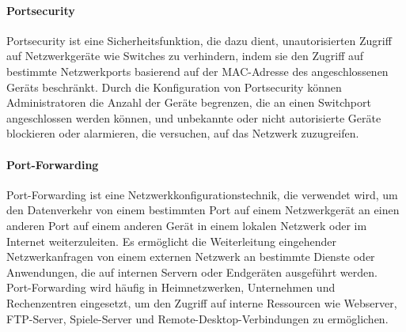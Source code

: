\paragraph{Portsecurity}

Portsecurity ist eine Sicherheitsfunktion, die dazu dient, unautorisierten Zugriff auf Netzwerkgeräte wie Switches zu verhindern, indem sie den Zugriff auf bestimmte Netzwerkports basierend auf der MAC-Adresse des angeschlossenen Geräts beschränkt. Durch die Konfiguration von Portsecurity können Administratoren die Anzahl der Geräte begrenzen, die an einen Switchport angeschlossen werden können, und unbekannte oder nicht autorisierte Geräte blockieren oder alarmieren, die versuchen, auf das Netzwerk zuzugreifen.

\paragraph{Port-Forwarding}

Port-Forwarding ist eine Netzwerkkonfigurationstechnik, die verwendet wird, um den Datenverkehr von einem bestimmten Port auf einem Netzwerkgerät an einen anderen Port auf einem anderen Gerät in einem lokalen Netzwerk oder im Internet weiterzuleiten. Es ermöglicht die Weiterleitung eingehender Netzwerkanfragen von einem externen Netzwerk an bestimmte Dienste oder Anwendungen, die auf internen Servern oder Endgeräten ausgeführt werden. Port-Forwarding wird häufig in Heimnetzwerken, Unternehmen und Rechenzentren eingesetzt, um den Zugriff auf interne Ressourcen wie Webserver, FTP-Server, Spiele-Server und Remote-Desktop-Verbindungen zu ermöglichen.

\clearpage